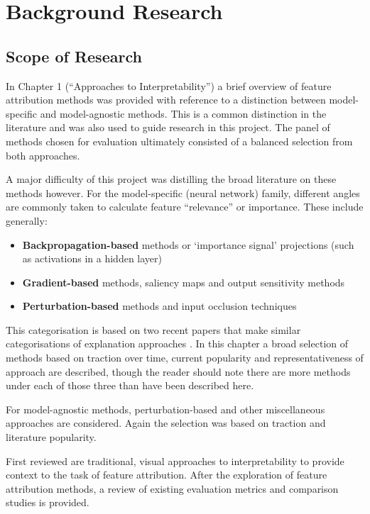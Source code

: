 \documentclass[main]{subfiles}
\begin{document}
\chapter{Background Research}

\section{Scope of Research} \label{sec:scoperesearch}

In Chapter 1 (``Approaches to Interpretability'') a brief overview of feature attribution methods was provided with reference to a distinction between model-specific and model-agnostic methods. This is a common distinction in the literature and was also used to guide research in this project. The panel of methods chosen for evaluation ultimately consisted of a balanced selection from both approaches. 

A major difficulty of this project was distilling the broad literature on these methods however. For the model-specific (neural network) family, different angles are commonly taken to calculate feature ``relevance'' or importance. These include generally:
\begin{itemize}
\item \textbf{Backpropagation-based} methods or `importance signal' projections (such as activations in a hidden layer)
\item \textbf{Gradient-based} methods, saliency maps and output sensitivity methods
\item \textbf{Perturbation-based} methods and input occlusion techniques
\end{itemize}

This categorisation is based on two recent papers that make similar categorisations of explanation approaches  \cite{deeplift} \cite{patternnet}. In this chapter a broad selection of methods based on traction over time, current popularity and representativeness of approach are described, though the reader should note there are more methods under each of those three than have been described here.

For model-agnostic methods, perturbation-based and other miscellaneous approaches are considered. Again the selection was based on traction and literature popularity.

First reviewed are traditional, visual approaches to interpretability to provide context to the task of feature attribution. After the exploration of feature attribution methods, a review of existing evaluation metrics and comparison studies is provided.
\end{document}
